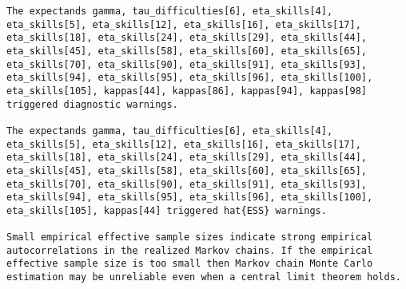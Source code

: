 \documentclass[
  letterpaper,
  DIV=11,
  numbers=noendperiod]{scrartcl}
\newenvironment{Shaded}{\begin{snugshade}}{\end{snugshade}}
\newcommand{\AttributeTok}[1]{\textcolor[rgb]{0.40,0.45,0.13}{#1}}
\newcommand{\ConstantTok}[1]{\textcolor[rgb]{0.56,0.35,0.01}{#1}}
\newcommand{\FunctionTok}[1]{\textcolor[rgb]{0.28,0.35,0.67}{#1}}
\newcommand{\NormalTok}[1]{\textcolor[rgb]{0.00,0.23,0.31}{#1}}
\newcommand{\OtherTok}[1]{\textcolor[rgb]{0.00,0.23,0.31}{#1}}
\newcommand{\SpecialCharTok}[1]{\textcolor[rgb]{0.37,0.37,0.37}{#1}}
\newcommand{\StringTok}[1]{\textcolor[rgb]{0.13,0.47,0.30}{#1}}
\begin{document}
\begin{Shaded}
\end{Shaded}

\begin{verbatim}
The expectands gamma, tau_difficulties[6], eta_skills[4],
eta_skills[5], eta_skills[12], eta_skills[16], eta_skills[17],
eta_skills[18], eta_skills[24], eta_skills[29], eta_skills[44],
eta_skills[45], eta_skills[58], eta_skills[60], eta_skills[65],
eta_skills[70], eta_skills[90], eta_skills[91], eta_skills[93],
eta_skills[94], eta_skills[95], eta_skills[96], eta_skills[100],
eta_skills[105], kappas[44], kappas[86], kappas[94], kappas[98]
triggered diagnostic warnings.

The expectands gamma, tau_difficulties[6], eta_skills[4],
eta_skills[5], eta_skills[12], eta_skills[16], eta_skills[17],
eta_skills[18], eta_skills[24], eta_skills[29], eta_skills[44],
eta_skills[45], eta_skills[58], eta_skills[60], eta_skills[65],
eta_skills[70], eta_skills[90], eta_skills[91], eta_skills[93],
eta_skills[94], eta_skills[95], eta_skills[96], eta_skills[100],
eta_skills[105], kappas[44] triggered hat{ESS} warnings.

Small empirical effective sample sizes indicate strong empirical
autocorrelations in the realized Markov chains. If the empirical
effective sample size is too small then Markov chain Monte Carlo
estimation may be unreliable even when a central limit theorem holds.
\end{verbatim}
\end{document}
